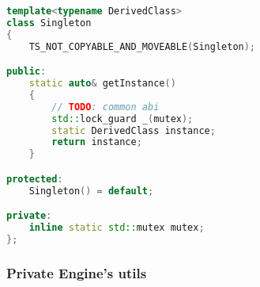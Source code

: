 \begin{lstlisting}[language=c++, caption=Singleton of Public Engine's utils(./engine/include/tsengine/utils.hpp)]
template<typename DerivedClass>
class Singleton
{
    TS_NOT_COPYABLE_AND_MOVEABLE(Singleton);

public:
    static auto& getInstance()
    {
        // TODO: common abi
        std::lock_guard _(mutex);
        static DerivedClass instance;
        return instance;
    }

protected:
    Singleton() = default;

private:
    inline static std::mutex mutex;
};
\end{lstlisting}

\newpage

\subsubsection{Private Engine's utils}
